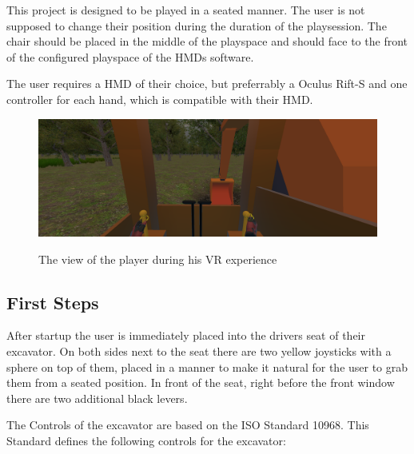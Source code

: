 \documentclass[journal]{vgtc}                     %
\begin{document}
This project is designed to be played in a seated manner. The user is not supposed to change their position during the duration of the playsession. The chair should be placed in the middle of the playspace and should face to the front of the configured playspace of the HMDs software.

The user requires a HMD of their choice, but preferrably a Oculus Rift-S and one controller for each hand, which is compatible with their HMD.

\begin{figure}[tb]%
  \centering %
  \includegraphics[width=\columnwidth, alt={The view from the cabin of a excavator. Each hand is on the joystick for controlling the vehicles arms and body}]{ExcavatorCabinView}
  \caption{%
  	The view of the player during his VR experience%
  }
  \label{fig:cabin_view}
\end{figure}

\subsection{First Steps}
After startup the user is immediately placed into the drivers seat of their excavator. On both sides next to the seat there are two yellow joysticks with a sphere on top of them, placed in a manner to make it natural for the user to grab them from a seated position. In front of the seat, right before the front window there are two additional black levers.

The Controls of the excavator are based on the ISO Standard 10968. This Standard defines the following controls for the excavator:
\end{document}
